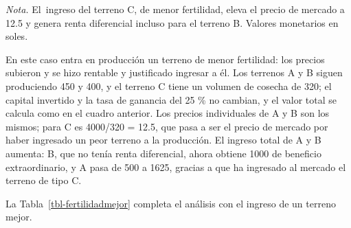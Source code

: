 \documentclass[
  man,
  floatsintext,
  longtable,
  a4paper,
  nolmodern,
  notxfonts,
  notimes,
  12pt,
  colorlinks=true,linkcolor=blue,citecolor=blue,urlcolor=blue]{apa7}
\begin{document}
\begin{table}
\vspace{-20pt}
\noindent \emph{Nota.} El~ingreso del terreno C, de menor fertilidad,
eleva el precio de mercado a 12.5 y genera renta diferencial incluso
para el terreno B. Valores monetarios en soles.

\end{table}

En este caso entra en producción un terreno de menor fertilidad: los
precios subieron y se hizo rentable y justificado ingresar a él. Los
terrenos A y B siguen produciendo 450 y 400, y el terreno C tiene un
volumen de cosecha de 320; el capital invertido y la tasa de ganancia
del 25 \% no cambian, y el valor total se calcula como en el cuadro
anterior. Los precios individuales de A y B son los mismos; para C es
4000/320 = 12.5, que pasa a ser el precio de mercado por haber ingresado
un peor terreno a la producción. El ingreso total de A y B aumenta: B,
que no tenía renta diferencial, ahora obtiene 1000 de beneficio
extraordinario, y A pasa de 500 a 1625, gracias a que ha ingresado al
mercado el terreno de tipo C.

La Tabla~\ref{tbl-fertilidadmejor} completa el análisis con el ingreso
de un terreno mejor.
\end{document}
